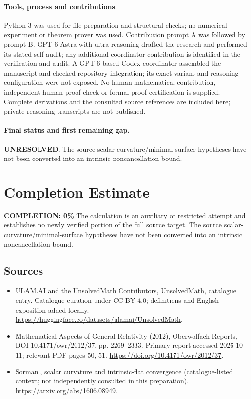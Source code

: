 \documentclass[11pt]{article}
\begin{document}
\paragraph{Tools, process and contributions.}
Python 3 was used for file preparation and structural checks; no numerical experiment or theorem prover was used. Contribution prompt A was followed by prompt B. GPT-6 Astra with ultra reasoning drafted the research and performed its stated self-audit; any additional coordinator contribution is identified in the verification and audit. A GPT-6-based Codex coordinator assembled the manuscript and checked repository integration; its exact variant and reasoning configuration were not exposed. No human mathematical contribution, independent human proof check or formal proof certification is supplied. Complete derivations and the consulted source references are included here; private reasoning transcripts are not published.

\paragraph{Final status and first remaining gap.}
\textbf{UNRESOLVED}. The source scalar-curvature/minimal-surface hypotheses have not been converted into an intrinsic noncancellation bound.

\section{Completion Estimate}
\noindent\textbf{COMPLETION: 0\%}
The calculation is an auxiliary or restricted attempt and establishes no newly verified portion of the full source target. The source scalar-curvature/minimal-surface hypotheses have not been converted into an intrinsic noncancellation bound.

\subsection{Sources}
\begin{itemize}
\item[\hypertarget{source:statement:1}{S1}] ULAM.AI and the UnsolvedMath Contributors, UnsolvedMath, catalogue entry. Catalogue curation under CC BY 4.0; definitions and English exposition added locally.
\url{https://huggingface.co/datasets/ulamai/UnsolvedMath}.
\item[\hypertarget{source:statement:2}{S2}] Mathematical Aspects of General Relativity (2012), Oberwolfach Reports, DOI 10.4171/owr/2012/37, pp. 2269--2333. Primary report accessed 2026-10-11; relevant PDF pages 50, 51.
\url{https://doi.org/10.4171/owr/2012/37}.
\item[\hypertarget{source:statement:3}{S3}] Sormani, scalar curvature and intrinsic-flat convergence (catalogue-listed context; not independently consulted in this preparation).
\url{https://arxiv.org/abs/1606.08949}.
\end{itemize}
\label{end:statement}
\end{document}
